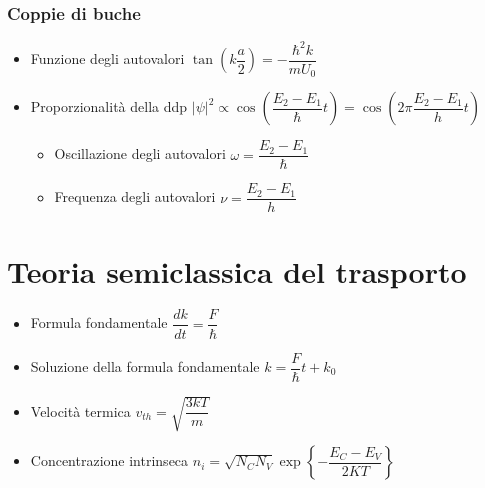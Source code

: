 \documentclass{article}
\begin{document}
\newpage

\subsubsection{Coppie di buche}
\begin{itemize}
  \item Funzione degli autovalori \( \tan\left( k \dfrac{a}{2} \right) = - \dfrac{\hbar ^2 k}{m U_0} \)
  \item Proporzionalità della ddp \( \left| \psi \right| ^ 2 \propto \cos \left( \dfrac{E_2 - E_1}{\hbar} t \right) = \cos \left( 2 \pi \dfrac{E_2 - E_1}{h} t \right)  \)
        \begin{itemize}
          \item Oscillazione degli autovalori \( \omega = \dfrac{E_2 - E_1}{\hbar} \)
          \item Frequenza degli autovalori \( \nu = \dfrac{E_2 - E_1}{h} \)
        \end{itemize}
\end{itemize}

\section{Teoria semiclassica del trasporto}
\begin{itemize}
  \item Formula fondamentale \( \dfrac{dk}{dt} = \dfrac{F}{\hbar} \)
  \item Soluzione della formula fondamentale \( k = \dfrac{F}{\hbar} t + k_0 \)
  \item Velocità termica \( \displaystyle v_{th} = \sqrt{\dfrac{3 k T}{m}} \)
  \item Concentrazione intrinseca \( n_i = \sqrt{N_C N_V} \exp{\left\{ - \dfrac{E_C - E_V}{2 K T}\right\}} \)
\end{itemize}
\end{document}

